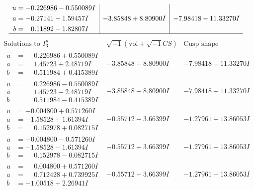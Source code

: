 \documentclass[1p]{elsarticle_modified}
\theoremstyle{definition}
\newcommand{\I}{\sqrt{-1}}
\begin{document}
$$\begin{array}{c|c|c}
\begin{aligned}
u &= -0.226986 - 0.550089 I \\
a &= -0.27141 - 1.59457 I \\
b &= \phantom{-}0.11892 - 1.82807 I\end{aligned}
 & -3.85848 + 8.80900 I & -7.98418 - 11.33270 I\\
 \hline 
 \end{array}$$\newpage$$\begin{array}{c|c|c}  
\text{Solutions to }I^u_{3}& \I (\text{vol} + \sqrt{-1}CS) & \text{Cusp shape}\\
 \hline 
\begin{aligned}
u &= \phantom{-}0.226986 + 0.550089 I \\
a &= \phantom{-}1.45723 + 2.48719 I \\
b &= \phantom{-}0.511984 + 0.415389 I\end{aligned}
 & -3.85848 + 8.80900 I & -7.98418 - 11.33270 I \\ \hline\begin{aligned}
u &= \phantom{-}0.226986 - 0.550089 I \\
a &= \phantom{-}1.45723 - 2.48719 I \\
b &= \phantom{-}0.511984 - 0.415389 I\end{aligned}
 & -3.85848 - 8.80900 I & -7.98418 + 11.33270 I \\ \hline\begin{aligned}
u &= -0.004800 + 0.571260 I \\
a &= -1.58528 + 1.61394 I \\
b &= \phantom{-}0.152978 + 0.082715 I\end{aligned}
 & -0.55712 - 3.66399 I & -1.27961 + 13.86053 I \\ \hline\begin{aligned}
u &= -0.004800 - 0.571260 I \\
a &= -1.58528 - 1.61394 I \\
b &= \phantom{-}0.152978 - 0.082715 I\end{aligned}
 & -0.55712 + 3.66399 I & -1.27961 - 13.86053 I \\ \hline\begin{aligned}
u &= \phantom{-}0.004800 + 0.571260 I \\
a &= \phantom{-}0.712428 + 0.739925 I \\
b &= -1.00518 + 2.26941 I\end{aligned}
 & -0.55712 + 3.66399 I & -1.27961 - 13.86053 I \\ \hline\begin{aligned}

\end{aligned}
\end{array}$$
\end{document}
